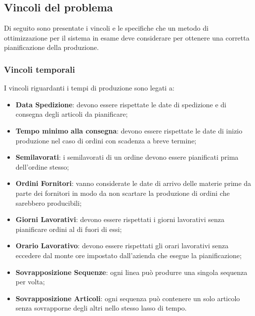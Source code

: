 \subsection{Vincoli del problema}
Di seguito sono presentate i vincoli e le specifiche che un metodo di ottimizzazione per il sistema in esame deve considerare per ottenere una corretta pianificazione della produzione.

\subsubsection{Vincoli temporali}
I vincoli riguardanti i tempi di produzione sono legati a:
\begin{itemize}
	\item \textbf{Data Spedizione}: devono essere rispettate le date di spedizione e di consegna degli articoli da pianificare;
	\item \textbf{Tempo minimo alla consegna}: devono essere rispettate le date di inizio produzione nel caso di ordini con scadenza a breve termine;
	
	\item \textbf{Semilavorati}: i semilavorati di un ordine devono essere pianificati prima dell'ordine stesso;
	
	\item \textbf{Ordini Fornitori}: vanno considerate le date di arrivo delle materie prime da parte dei fornitori in modo da non scartare la produzione di ordini che sarebbero producibili;
	
	\item \textbf{Giorni Lavorativi}: devono essere rispettati i giorni lavorativi senza pianificare ordini al di fuori di essi;
	\item \textbf{Orario Lavorativo}: devono essere rispettati gli orari lavorativi senza eccedere dal monte ore impostato dall'azienda che esegue la pianificazione;
	\item \textbf{Sovrapposizione Sequenze}: ogni linea può produrre una singola sequenza per volta;	
	\item \textbf{Sovrapposizione Articoli}: ogni sequenza può contenere un solo articolo senza sovrapporne degli altri nello stesso lasso di tempo.
\end{itemize}

